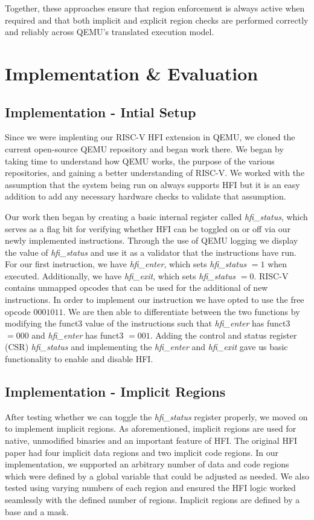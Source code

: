 \documentclass[conference,compsoc]{IEEEtran}
\begin{document}
Together, these approaches ensure that region enforcement is always active when required and that both implicit and explicit region checks are performed correctly and reliably across QEMU's translated execution model.


\section{Implementation \& Evaluation}
\label{sec:impl-eval}

\subsection{Implementation - Intial Setup}
Since we were implenting our RISC-V HFI extension in QEMU, we cloned the current open-source QEMU repository and began work there. We began by taking time to understand how QEMU works, the purpose of the various repositories, and gaining a better understanding of RISC-V. We worked with the assumption that the system being run on always supports HFI but it is an easy addition to add any necessary hardware checks to validate that assumption.

Our work then began by creating a basic internal register called \textit{hfi\_status}, which serves as a flag bit for verifying whether HFI can be toggled on or off via our newly implemented instructions. Through the use of QEMU logging we display the value of \textit{hfi\_status} and use it as a validator that the instructions have run.
For our first instruction, we have \textit{hfi\_enter}, which sets \textit{hfi\_status} $=1$ when executed. 
Additionally, we have \textit{hfi\_exit}, which sets \textit{hfi\_status} $=0$.
RISC-V contains unmapped opcodes that can be used for the additional of new instructions.
In order to implement our instruction we have opted to use the free opcode $0001011$.
We are then able to differentiate between the two functions by modifying the funct3 value of the instructions such that \textit{hfi\_enter} has funct3 $= 000$ and \textit{hfi\_enter} has funct3 $= 001$. Adding the control and status register (CSR) \textit{hfi\_status} and implementing the \textit{hfi\_enter} and \textit{hfi\_exit} gave us basic functionality to enable and disable HFI.

\subsection{Implementation - Implicit Regions}
After testing whether we can toggle the \textit{hfi\_status} register properly, we moved on to implement implicit regions. As aforementioned, implicit regions are used for native, unmodified binaries and an important feature of HFI. The original HFI paper had four implicit data regions and two implicit code regions. In our implementation, we supported an arbitrary number of data and code regions which were defined by a global variable that could be adjusted as needed. We also tested using varying numbers of each region and ensured the HFI logic worked seamlessly with the defined number of regions. Implicit regions are defined by a base and a mask.
\end{document}

